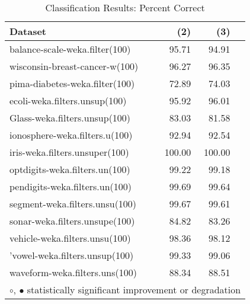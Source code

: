 \documentclass{article}
\begin{document}
\begin{table}[H]
\caption{\label{labelname}Classification Results: Percent Correct}
\footnotesize
{\centering \begin{tabular}{lrr@{\hspace{0.1cm}}c}
\\
\hline
Dataset & (2)& (3) & \\
\hline
balance-scale-weka.filter(100) &  95.71 &  94.91 &         \\
wisconsin-breast-cancer-w(100) &  96.27 &  96.35 &         \\
pima-diabetes-weka.filter(100) &  72.89 &  74.03 &         \\
ecoli-weka.filters.unsup(100) &  95.92 &  96.01 &         \\
Glass-weka.filters.unsup(100) &  83.03 &  81.58 &         \\
ionosphere-weka.filters.u(100) &  92.94 &  92.54 &         \\
iris-weka.filters.unsuper(100) & 100.00 & 100.00 &         \\
optdigits-weka.filters.un(100) &  99.22 &  99.18 &         \\
pendigits-weka.filters.un(100) &  99.69 &  99.64 &         \\
segment-weka.filters.unsu(100) &  99.67 &  99.61 &         \\
sonar-weka.filters.unsupe(100) &  84.82 &  83.26 &         \\
vehicle-weka.filters.unsu(100) &  98.36 &  98.12 &         \\
'vowel-weka.filters.unsup(100) &  99.33 &  99.06 &         \\
waveform-weka.filters.uns(100) &  88.34 &  88.51 &         \\
\hline
\multicolumn{4}{c}{$\circ$, $\bullet$ statistically significant improvement or degradation}\\
\end{tabular} \footnotesize \par}
\end{table}
\end{document}
